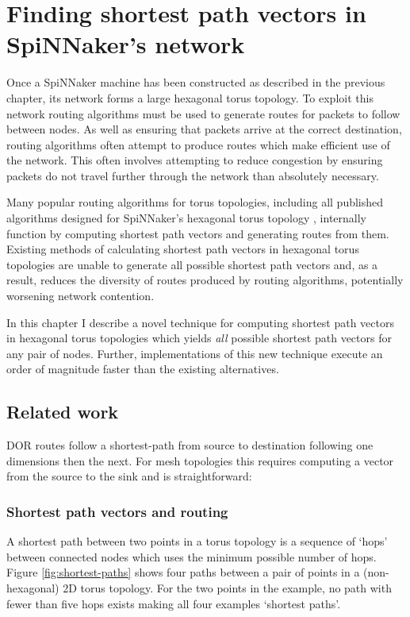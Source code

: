 \chapter{Finding shortest path vectors in SpiNNaker's network}
	
	Once a SpiNNaker machine has been constructed as described in the previous
	chapter, its network forms a large hexagonal torus topology. To exploit this
	network routing algorithms must be used to generate routes for packets to
	follow between nodes. As well as ensuring that packets arrive at the correct
	destination, routing algorithms often attempt to produce routes which make
	efficient use of the network. This often involves attempting to reduce
	congestion by ensuring packets do not travel further through the network than
	absolutely necessary.
	
	Many popular routing algorithms for torus topologies, including all published
	algorithms designed for SpiNNaker's hexagonal torus topology
	\cite{davies12,navaridas14}, internally function by computing shortest path
	vectors and generating routes from them. Existing methods of calculating
	shortest path vectors in hexagonal torus topologies are unable to generate
	all possible shortest path vectors and, as a result, reduces the diversity of
	routes produced by routing algorithms, potentially worsening network
	contention.
	
	In this chapter I describe a novel technique for computing shortest path
	vectors in hexagonal torus topologies which yields \emph{all} possible
	shortest path vectors for any pair of nodes. Further, implementations of this
	new technique execute an order of magnitude faster than the existing
	alternatives.
	
	\section{Related work}
		
		DOR routes follow a shortest-path from source to destination following one
		dimensions then the next. For mesh topologies this requires computing a
		vector from the source to the sink and is straightforward:
		
		\subsection{Shortest path vectors and routing}
	
			A shortest path between two points in a torus topology is a sequence of
			`hops' between connected nodes which uses the minimum possible number of
			hops. Figure \ref{fig:shortest-paths} shows four paths between a pair of
			points in a (non-hexagonal) 2D torus topology. For the two points in the
			example, no path with fewer than five hops exists making all four examples
			`shortest paths'.
			
